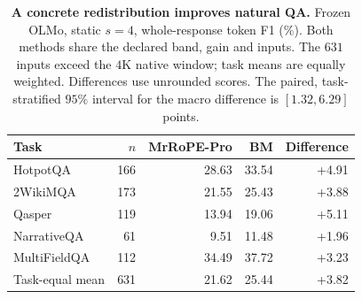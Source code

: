 \begin{table}[!ht]
\centering\small
\caption{\textbf{A concrete redistribution improves natural QA.} Frozen OLMo, static $s=4$, whole-response token F1 (\%). Both methods share the declared band, gain and inputs. The $631$ inputs exceed the $4$K native window; task means are equally weighted. Differences use unrounded scores. The paired, task-stratified $95\%$ interval for the macro difference is $[1.32,6.29]$ points.}
\label{tab:bm-qa-main}
\begin{tabular}{@{}lrrrr@{}}
\toprule
Task & $n$ & MrRoPE-Pro & BM & Difference\\
\midrule
HotpotQA & 166 & 28.63 & 33.54 & +4.91 \\
2WikiMQA & 173 & 21.55 & 25.43 & +3.88 \\
Qasper & 119 & 13.94 & 19.06 & +5.11 \\
NarrativeQA & 61 & 9.51 & 11.48 & +1.96 \\
MultiFieldQA & 112 & 34.49 & 37.72 & +3.23 \\
\midrule
Task-equal mean & 631 & 21.62 & 25.44 & +3.82 \\
\bottomrule
\end{tabular}
\end{table}
